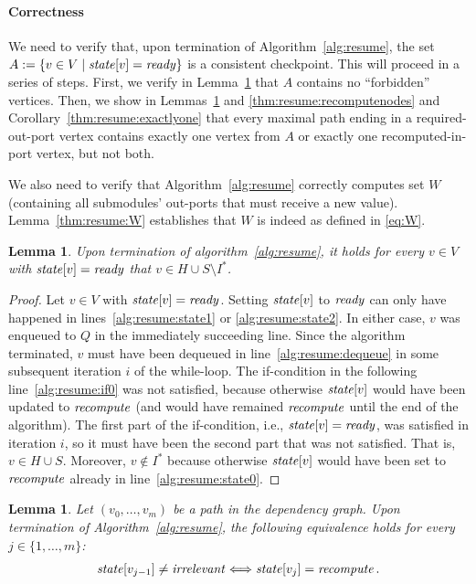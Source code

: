\documentclass[paper=letter,fontsize=11pt,captions=tableheading]{scrartcl}
\numberwithin{equation}{section}
\newcommand{\SiM}{\mathchoice{\,}{}{}{}}
\theoremstyle{algorithm}
\theoremstyle{plain}
\newtheorem{lemma}[equation]{Lemma}
\theoremstyle{nonumberplain}
\newtheorem{proof}{Proof}
\begin{document}
\paragraph{Correctness}

We need to verify that, upon termination of Algorithm~\ref{alg:resume}, the set $A := \{ v \in V \mid \mathit{state}[v] = \mathit{ready} \}$ is a consistent checkpoint. This will proceed in a series of steps. First, we verify in Lemma~\ref{thm:resume:HuS} that $A$ contains no ``forbidden'' vertices. Then, we show in Lemmas~\ref{thm:resume:allpaths} and \ref{thm:resume:recomputenodes} and Corollary~\ref{thm:resume:exactlyone} that every maximal path ending in a required-out-port vertex contains exactly one vertex from $A$ or exactly one recomputed-in-port vertex, but not both.

We also need to verify that Algorithm~\ref{alg:resume} correctly computes set $W$ (containing all submodules' out-ports that must receive a new value). Lemma~\ref{thm:resume:W} establishes that $W$ is indeed as defined in \eqref{eq:W}.

\begin{lemma} \label{thm:resume:HuS}
	Upon termination of algorithm~\ref{alg:resume}, it holds for every $v \in V$ with $\mathit{state}[v] = \mathit{ready}$ that $v \in H \cup S \setminus I^*$.
\end{lemma}

\begin{proof}
	Let $v \in V$ with $\mathit{state}[v] = \mathit{ready}$. Setting $\mathit{state}[v]$ to $\mathit{ready}$ can only have happened in lines~\ref{alg:resume:state1} or \ref{alg:resume:state2}. In either case, $v$ was enqueued to $Q$ in the immediately succeeding line. Since the algorithm terminated, $v$ must have been dequeued in line~\ref{alg:resume:dequeue} in some subsequent iteration $i$ of the while-loop. The if-condition in the following line~\ref{alg:resume:if0} was not satisfied, because otherwise $\mathit{state}[v]$ would have been updated to $\mathit{recompute}$ (and would have remained $\mathit{recompute}$ until the end of the algorithm). The first part of the if-condition, i.e., $\mathit{state}[v] = \mathit{ready}$, was satisfied in  iteration $i$, so it must have been the second part that was not satisfied. That is, $v \in H \cup S$. Moreover, $v \notin I^*$ because otherwise $\mathit{state}[v]$ would have been set to $\mathit{recompute}$ already in line~\ref{alg:resume:state0}.
\end{proof}

\begin{lemma} \label{thm:resume:allpaths}
	Let $(v_0, \dots, v_m)$ be a path in the dependency graph. Upon termination of Algorithm~\ref{alg:resume}, the following equivalence holds for every $j \in \{ 1, \dots, m \}$:
	\begin{gather*}
		\state[v_{j-1}] \neq \irrelevant \Longleftrightarrow \state[v_j] = \recompute\SiM.
	\end{gather*}
\end{lemma}
\end{document}
